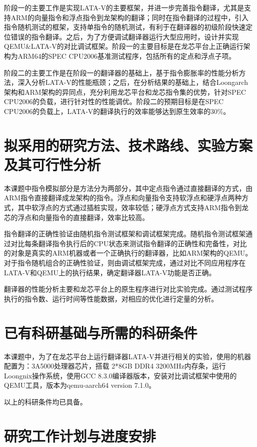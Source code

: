 阶段一的主要工作是实现LATA-V的主要框架，并进一步完善指令翻译，尤其是支持ARM的向量指令和浮点指令到龙架构的翻译；同时在指令翻译的过程中，引入指令随机测试的框架，支持单指令的随机测试，有利于在翻译器的初级阶段快速定位错误的指令翻译。之后，为了方便调试翻译器运行大型应用时，设计并实现QEMU{\&}LATA-V的对比调试框架。阶段一的主要目标是在龙芯平台上正确运行架构为ARM64的SPEC CPU2006基准测试程序，包括所有的定点和浮点子项。

阶段二的主要工作是在阶段一的翻译器的基础上，基于指令膨胀率的性能分析方法，深入分析LATA-V的性能瓶颈；之后，在分析结果的基础上，结合Loongarch架构和ARM架构的异同点，充分利用龙芯平台和龙芯指令集的优势，针对SPEC CPU2006的负载，进行针对性的性能调优。阶段二的预期目标是在SPEC CPU2006的负载上，LATA-V的翻译执行的效率能够达到原生效率的30{\%}。
\section{拟采用的研究方法、技术路线、实验方案及其可行性分析}
本课题中指令模拟部分是方法分为两部分，其中定点指令通过直接翻译的方式，由ARM指令直接翻译成龙架构的指令。浮点和向量指令支持软浮点和硬浮点两种方式，其中软浮点的方式通过插桩实现，效率较低；硬浮点方式支持ARM指令到龙芯的浮点和向量指令的直接翻译，效率比较高。

指令翻译的正确性验证由随机指令测试框架和调试框架完成。随机指令测试框架通过对比每条翻译指令执行后的CPU状态来测试指令翻译的正确性和完备性，对比的对象是真实的ARM机器或者一个正确执行的翻译器，比如ARM架构的QEMU。对于指令随机组合的正确性验证，则由调试框架完成，通过对比不同应用程序在LATA-V和QEMU上的执行结果，确定翻译器LATA-V功能是否正确。

翻译器的性能分析主要和龙芯平台上的原生程序进行对比实验完成。通过测试程序执行的指令数、运行时间等性能数据，对相应的优化进行定量的分析。
\section{已有科研基础与所需的科研条件}

本课题中，为了在龙芯平台上运行翻译器LATA-V并进行相关的实验，使用的机器配置为：3A5000处理器芯片，搭载 2*8GB DDR4 3200MHz内存条，运行Loongnix操作系统，使用GCC 8.3.0编译器版本，安装对比调试框架中使用的QEMU工具，版本为qemu-aarch64 version 7.1.0。

以上的科研条件均已具备。

\section{研究工作计划与进度安排}

